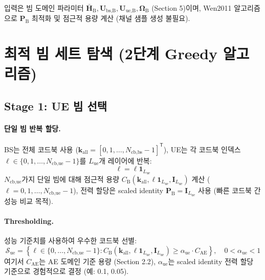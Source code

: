 \documentclass[10pt]{article}
\begin{document}
입력은 빔 도메인 파라미터 $\bar{\mathbf{H}}_{\text{B}}, \mathbf{U}_{\text{bs,B}}, \mathbf{U}_{\text{ue,B}}, \boldsymbol{\Omega}_{\text{B}}$ (Section 5)이며, Wen2011 알고리즘으로 $\mathbf{P}_{\text{B}}$ 최적화 및 점근적 용량 계산 (채널 샘플 생성 불필요).

\newpage
\section{최적 빔 세트 탐색 (2단계 Greedy 알고리즘)}

\subsection{Stage 1: UE 빔 선택}

\paragraph{단일 빔 반복 할당.}
BS는 전체 코드북 사용 ($\boldsymbol{k}_{\text{all}} = [0, 1, \ldots, N_{\text{cb,bs}}-1]^{\mathsf{T}}$), UE는 각 코드북 인덱스 $\ell \in \{0, 1, \ldots, N_{\text{cb,ue}}-1\}$를 $L_{\text{ue}}$개 레이어에 반복:
\begin{equation}
\boldsymbol{\ell} = \ell \mathbf{1}_{L_{\text{ue}}}
\end{equation}
$N_{\text{cb,ue}}$가지 단일 빔에 대해 점근적 용량 $C_{\text{B}}(\boldsymbol{k}_{\text{all}}, \ell \mathbf{1}_{L_{\text{ue}}}, \mathbf{I}_{L_{\text{ue}}})$ 계산 ($\ell = 0, 1, \ldots, N_{\text{cb,ue}}-1$), 전력 할당은 scaled identity $\mathbf{P}_{\text{B}} = \mathbf{I}_{L_{\text{ue}}}$ 사용 (빠른 코드북 간 성능 비교 목적).

\paragraph{Thresholding.}
성능 기준치를 사용하여 우수한 코드북 선별:
\begin{equation}
\mathcal{S}_{\text{ue}} = \left\{ \ell \in \{0, \ldots, N_{\text{cb,ue}}-1\} : C_{\text{B}}(\boldsymbol{k}_{\text{all}}, \ell \mathbf{1}_{L_{\text{ue}}}, \mathbf{I}_{L_{\text{ue}}}) \geq \alpha_{\text{ue}} \cdot C_{\text{AE}} \right\}, \quad 0 < \alpha_{\text{ue}} < 1
\end{equation}
여기서 $C_{\text{AE}}$는 AE 도메인 기준 용량 (Section 2.2), $\alpha_{\text{ue}}$는 scaled identity 전력 할당 기준으로 경험적으로 결정 (예: 0.1, 0.05).
\end{document}
